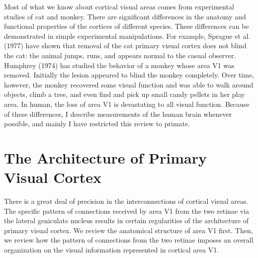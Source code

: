 Most of what we know about cortical visual areas comes from
experimental studies of cat and monkey.  There are significant
differences in the anatomy and functional properties of the
cortices of different species.
These differences can be demonstrated in simple
experimental manipulations.  For example, Sprague et al. (1977) have
shown that removal of the cat primary visual cortex does not blind the
cat: the animal jumps, runs, and appears normal to the casual
observer.  Humphrey (1974) has studied the behavior of a monkey whose
area V1 was removed.  Initially the lesion appeared to blind the
monkey completely.  Over time, however, the monkey recovered some
visual function and was able to walk around objects, climb a tree, and
even find and pick up small candy pellets in her play area.  In human,
the loss of area V1 is devastating to all visual function.
Because of these differences, I describe measurements
of the human brain whenever possible,
and mainly I have restricted this review to primate.

\section{The Architecture of Primary Visual Cortex} 

There is a great deal of precision
in the interconnections of cortical visual areas.
The specific pattern of connections received by area V1
from the two retinae via the lateral geniculate nucleus
results in certain regularities of the
architecture of primary visual cortex.
We review the anatomical structure of area V1 first.
Then, we review how the pattern of connections
from the two retinae imposes an overall organization
on the visual information represented in cortical area V1.

